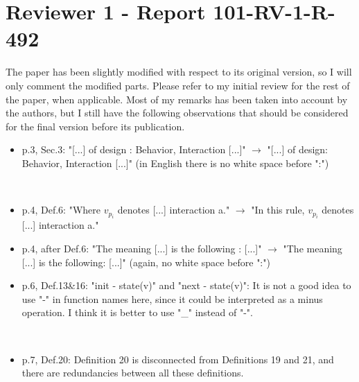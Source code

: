 \section{Reviewer 1 - Report 101-RV-1-R-492}
The paper has been slightly modified with respect to its original version, so I
will only comment the modified parts.
Please refer to my initial review for the rest of the paper, when applicable.
Most of my remarks has been taken into account by the authors, but I still have
the following observations that should be considered for the final version
before its publication.

\begin{itemize}
\item p.3, Sec.3: "[...] of design : Behavior, Interaction [...]" $\rightarrow$ "[...] of
design: Behavior, Interaction [...]" (in English there is no white space before ":")

~


\item p.4, Def.6: "Where $v_{p_i}$ denotes [...] interaction a." $\rightarrow$ "In this rule,
$v_{p_i}$ denotes [...] interaction a."

\done

\item p.4, after Def.6: "The meaning [...] is the following : [...]" $\rightarrow$ "The meaning
[...] is the following: [...]" (again, no white space before ":")

\done


\item p.6, Def.13\&16: "init - state(v)" and "next - state(v)": It is not a good idea
to use "-" in function names here, since it could be interpreted as a minus
operation. I think it is better to use "\_" instead of "-".

~


\item p.7, Def.20: Definition 20 is disconnected from Definitions 19 and 21, and
there are redundancies between all these definitions.


~



\end{itemize}
